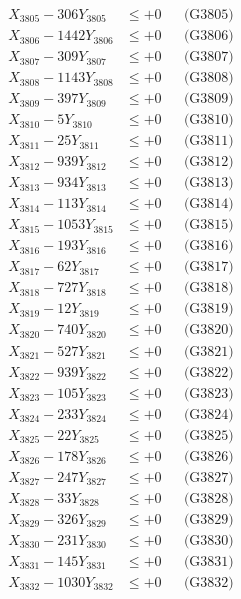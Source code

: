 \documentclass[a4paper,10pt]{article}
\begin{document}
{\begin{align}
X_{3805} - 306Y_{3805} &\leq +0 && \text{(G3805)} \\
X_{3806} - 1442Y_{3806} &\leq +0 && \text{(G3806)} \\
X_{3807} - 309Y_{3807} &\leq +0 && \text{(G3807)} \\
X_{3808} - 1143Y_{3808} &\leq +0 && \text{(G3808)} \\
X_{3809} - 397Y_{3809} &\leq +0 && \text{(G3809)} \\
X_{3810} - 5Y_{3810} &\leq +0 && \text{(G3810)} \\
\allowbreak
X_{3811} - 25Y_{3811} &\leq +0 && \text{(G3811)} \\
X_{3812} - 939Y_{3812} &\leq +0 && \text{(G3812)} \\
X_{3813} - 934Y_{3813} &\leq +0 && \text{(G3813)} \\
X_{3814} - 113Y_{3814} &\leq +0 && \text{(G3814)} \\
X_{3815} - 1053Y_{3815} &\leq +0 && \text{(G3815)} \\
X_{3816} - 193Y_{3816} &\leq +0 && \text{(G3816)} \\
X_{3817} - 62Y_{3817} &\leq +0 && \text{(G3817)} \\
X_{3818} - 727Y_{3818} &\leq +0 && \text{(G3818)} \\
X_{3819} - 12Y_{3819} &\leq +0 && \text{(G3819)} \\
X_{3820} - 740Y_{3820} &\leq +0 && \text{(G3820)} \\
\allowbreak
X_{3821} - 527Y_{3821} &\leq +0 && \text{(G3821)} \\
X_{3822} - 939Y_{3822} &\leq +0 && \text{(G3822)} \\
X_{3823} - 105Y_{3823} &\leq +0 && \text{(G3823)} \\
X_{3824} - 233Y_{3824} &\leq +0 && \text{(G3824)} \\
X_{3825} - 22Y_{3825} &\leq +0 && \text{(G3825)} \\
X_{3826} - 178Y_{3826} &\leq +0 && \text{(G3826)} \\
X_{3827} - 247Y_{3827} &\leq +0 && \text{(G3827)} \\
X_{3828} - 33Y_{3828} &\leq +0 && \text{(G3828)} \\
X_{3829} - 326Y_{3829} &\leq +0 && \text{(G3829)} \\
X_{3830} - 231Y_{3830} &\leq +0 && \text{(G3830)} \\
\allowbreak
X_{3831} - 145Y_{3831} &\leq +0 && \text{(G3831)} \\
X_{3832} - 1030Y_{3832} &\leq +0 && \text{(G3832)} \\

\end{align}}
\end{document}

